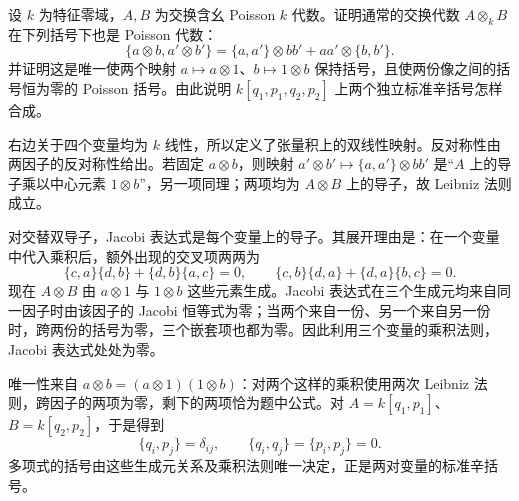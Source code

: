 \begin{exercise}\label{b4:ex:poisson-tensor-product}
	设 \(k\) 为特征零域，\(A,B\) 为交换含幺 Poisson \(k\) 代数。证明通常的交换代数 \(A\otimes_kB\) 在下列括号下也是 Poisson 代数：
	\[
		\{a\otimes b,a'\otimes b'\}
		=\{a,a'\}\otimes bb'+aa'\otimes\{b,b'\}.
	\]
	并证明这是唯一使两个映射 \(a\mapsto a\otimes1\)、\(b\mapsto1\otimes b\) 保持括号，且使两份像之间的括号恒为零的 Poisson 括号。由此说明 \(k[q_1,p_1,q_2,p_2]\) 上两个独立标准辛括号怎样合成。
\end{exercise}
\begin{solution}
	右边关于四个变量均为 \(k\) 线性，所以定义了张量积上的双线性映射。反对称性由两因子的反对称性给出。若固定 \(a\otimes b\)，则映射 \(a'\otimes b'\mapsto\{a,a'\}\otimes bb'\) 是“\(A\) 上的导子乘以中心元素 \(1\otimes b\)”，另一项同理；两项均为 \(A\otimes B\) 上的导子，故 Leibniz 法则成立。

	对交替双导子，Jacobi 表达式是每个变量上的导子。其展开理由是：在一个变量中代入乘积后，额外出现的交叉项两两为
	\[
		\{c,a\}\{d,b\}+\{d,b\}\{a,c\}=0,
		\qquad
		\{c,b\}\{d,a\}+\{d,a\}\{b,c\}=0.
	\]
	现在 \(A\otimes B\) 由 \(a\otimes1\) 与 \(1\otimes b\) 这些元素生成。Jacobi 表达式在三个生成元均来自同一因子时由该因子的 Jacobi 恒等式为零；当两个来自一份、另一个来自另一份时，跨两份的括号为零，三个嵌套项也都为零。因此利用三个变量的乘积法则，Jacobi 表达式处处为零。

	唯一性来自 \(a\otimes b=(a\otimes1)(1\otimes b)\)：对两个这样的乘积使用两次 Leibniz 法则，跨因子的两项为零，剩下的两项恰为题中公式。对 \(A=k[q_1,p_1]\)、\(B=k[q_2,p_2]\)，于是得到
	\[
		\{q_i,p_j\}=\delta_{ij},\qquad
		\{q_i,q_j\}=\{p_i,p_j\}=0.
	\]
	多项式的括号由这些生成元关系及乘积法则唯一决定，正是两对变量的标准辛括号。
\end{solution}

